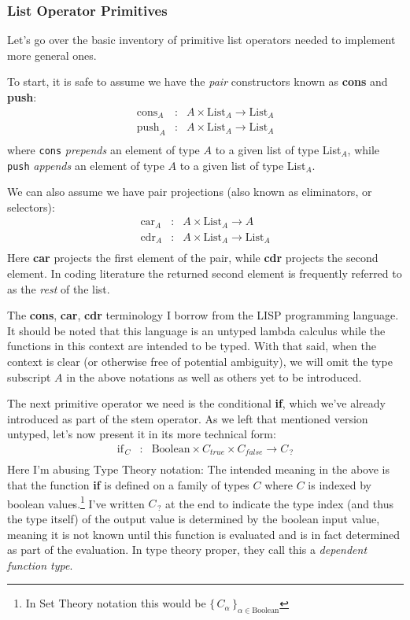 \documentclass[twoside]{article}
\newcommand{\strong}[1]{{\bfseries #1}}
\newcommand{\cons}{\mbox{cons}}
\newcommand{\car}{\mbox{car}}
\newcommand{\cdr}{\mbox{cdr}}
\newcommand{\push}{\mbox{push}}
\begin{document}
\subsubsection*{List Operator Primitives}

Let's go over the basic inventory of primitive list operators needed to implement more general ones.

To start, it is safe to assume we have the \emph{pair} constructors known as \strong{cons} and \strong{push}:
$$ \begin{array}{rcl}
\cons_A		& :	& A \times \mbox{List}_A \to \mbox{List}_A	\\
\push_A		& :	& A \times \mbox{List}_A \to \mbox{List}_A	\\
\end{array} $$
where \texttt{cons} \emph{prepends} an element of type $ A $ to a given list of type List$ _A $,
while \texttt{push} \emph{appends} an element of type $ A $ to a given list of type List$ _A $.

We can also assume we have pair projections (also known as eliminators, or selectors):
$$ \begin{array}{rcl}
\car_A	& :	& A \times \mbox{List}_A \to A				\\
\cdr_A	& :	& A \times \mbox{List}_A \to \mbox{List}_A		\\
\end{array} $$
Here \strong{car} projects the first element of the pair, while \strong{cdr} projects the second element.
In coding literature the returned second element is frequently referred to as the \emph{rest} of the list.

The \strong{cons}, \strong{car}, \strong{cdr} terminology I borrow from the LISP programming language. It should be
noted that this language is an untyped lambda calculus while the functions in this context are intended to be typed.
With that said, when the context is clear (or otherwise free of potential ambiguity), we will omit the type subscript
$ A $ in the above notations as well as others yet to be introduced.

The next primitive operator we need is the conditional \strong{if}, which we've already introduced as part of the stem
operator. As we left that mentioned version untyped, let's now present it in its more technical form:
$$ \begin{array}{rcl}
\mbox{if}_{\,C}	& :	& \mbox{Boolean} \times C_{true} \times C_{false} \to C_{\,?}	\\
\end{array} $$
Here I'm abusing Type Theory notation: The intended meaning in the above is that the function \strong{if} is defined
on a family of types $ C $ where $ C $ is indexed by boolean values.\footnote{In Set Theory notation this would be
$ \{\,C_\alpha\,\}_{\alpha\in\mbox{Boolean}} $} I've written $ C_{\,?} $ at the end to indicate the type index
(and thus the type itself) of the output value is determined by the boolean input value, meaning it is not known
until this function is evaluated and is in fact determined as part of the evaluation. In type theory proper,
they call this a \emph{dependent function type}.
\end{document}
